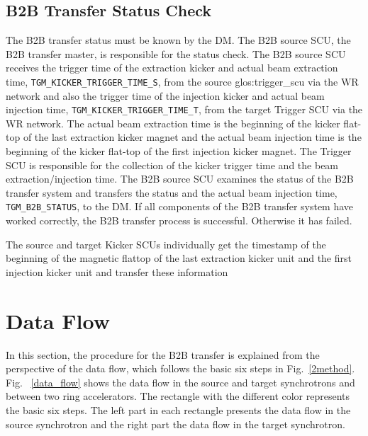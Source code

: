 %

\subsection{B2B Transfer Status Check}
The B2B transfer status must be known by the DM. The B2B source SCU, the B2B transfer master, is responsible for the status check. The B2B source SCU receives the trigger time of the extraction kicker and actual beam extraction time, \verb|TGM_KICKER_TRIGGER_TIME_S|, from the source \gls{glos:trigger_scu} via the WR network and also the trigger time of the injection kicker and actual beam injection time, \verb|TGM_KICKER_TRIGGER_TIME_T|, from the target Trigger SCU via the WR network. The actual beam extraction time is the beginning of the kicker flat-top of the last extraction kicker magnet and the actual beam injection time is the beginning of the kicker flat-top of the first injection kicker magnet. The Trigger SCU is responsible for the collection of the kicker trigger time and the beam extraction/injection time. The B2B source SCU examines the status of the B2B transfer system and transfers the status and the actual beam injection time, \verb|TGM_B2B_STATUS|, to the DM. If all components of the B2B transfer system have worked correctly, the B2B transfer process is successful. Otherwise it has failed. 

The source and target Kicker SCUs
individually get the timestamp of the beginning of the magnetic flattop of the last
extraction kicker unit and the first injection kicker unit and transfer these information
\section{Data Flow}
\label{cpt_data}
In this section, the procedure for the B2B transfer is explained from the perspective of the data flow, which follows the basic six steps in Fig.~\ref{2method}. Fig. ~\ref{data_flow} shows the data flow in the source and target synchrotrons and between two ring accelerators. The rectangle with the different color represents the basic six steps. The left part in each rectangle presents the data flow in the source synchrotron and the right part the data flow in the target synchrotron.


